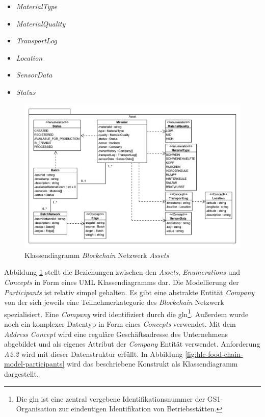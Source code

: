 \begin{itemize}
	\item \textit{MaterialType}
	\item \textit{MaterialQuality}
	\item \textit{TransportLog}
	\item \textit{Location}
	\item \textit{SensorData}
	\item \textit{Status}
\end{itemize}

\begin{figure}[H]
	\centering
	\includegraphics[width=1\linewidth]{pictures/hlc-food-chain-model-assets}
	\caption[Klassendiagramm \textit{Blockchain} Netzwerk \textit{Assets}]{Klassendiagramm \textit{Blockchain} Netzwerk \textit{Assets}}
	\label{fig:hlc-food-chain-model-assets}
\end{figure}

\noindent
Abbildung \ref{fig:hlc-food-chain-model-assets} stellt die Beziehungen zwischen den \textit{Assets}, \textit{Enumerations} und \textit{Concepts} in Form eines UML Klassendiagramms dar. Die Modellierung der \textit{Participants} ist relativ simpel gehalten. Es gibt eine abstrakte Entität \textit{Company} von der sich jeweils eine Teilnehmerkategorie des \textit{Blockchain} Netzwerk spezialisiert. Eine \textit{Company} wird identifiziert durch die \ac{gln}\footnote{Die \ac{gln} ist eine zentral vergebene Identifikationsnummer der GS1-Organisation zur eindeutigen Identifikation von Betriebsstätten.}. Außerdem wurde noch ein komplexer Datentyp in Form eines \textit{Concepts} verwendet. Mit dem \textit{Address} \textit{Concept} wird eine reguläre Geschäftsadresse des Unternehmens abgebildet und als eigenes Attribut der \textit{Company} Entität verwendet. Anforderung \textit{A2.2} wird mit dieser Datenstruktur erfüllt. In Abbildung \ref{fig:hlc-food-chain-model-participants} wird das beschriebene Konstrukt als Klassendiagramm dargestellt.


